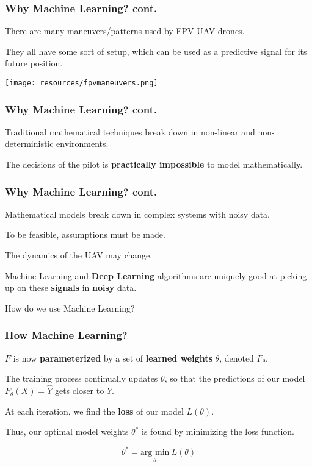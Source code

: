 \documentclass{beamer}
\begin{document}
\begin{frame}
    \frametitle{Why Machine Learning? cont.}

    There are \alert{many} maneuvers/patterns used by FPV UAV drones.

    They all have some sort of \alert{setup}, which can be used as a predictive
    signal for its future position.
    
    \centering
    \texttt{[image: resources/fpvmaneuvers.png]}
\end{frame}

\begin{frame}
    \frametitle{Why Machine Learning? cont.}

    Traditional mathematical techniques break down in non-linear and 
    non-deterministic environments.

    The decisions of the pilot is \textbf{practically impossible} to model 
    mathematically.
\end{frame}

\begin{frame}
    \frametitle{Why Machine Learning? cont.}

    Mathematical models break down in complex systems with noisy data.

    To be feasible, assumptions must be made.

    The dynamics of the UAV may change.

    Machine Learning and \textbf{Deep Learning} algorithms are uniquely good 
    at picking up on these \textbf{signals} in \textbf{noisy} data.
\end{frame}

\begin{frame}[standout]
    How do we use Machine Learning?
\end{frame}

\begin{frame}
    \frametitle{How Machine Learning?}

    $F$ is now \textbf{parameterized} by a set of \textbf{learned weights}
    $\theta$, denoted $F_\theta$.

    The training process continually updates $\theta$, so that the predictions 
    of our model $F_\theta(X) = \hat{Y}$ gets closer to $Y$.

    At each iteration, we find the \textbf{loss} of our model $L(\theta)$.

    Thus, our \alert{optimal} model weights $\theta^*$ is found by minimizing
    the loss function.
    
    $$ \theta^* = \underset{\theta}{\text{arg min}}\  L(\theta)$$

\end{frame}
\end{document}
